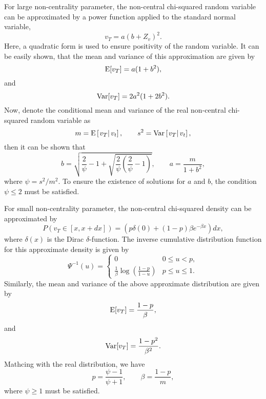 \documentclass[12pt]{article}
\begin{document}
    For large non-centrality parameter, the non-central chi-squared random variable can be approximated by a power function applied to the
    standard normal variable,
    \begin{equation}
      v_T=a\left(b+Z_v\right)^2.
      \label{Gaussian}
    \end{equation}
    Here, a quadratic form is used to ensure positivity of the random variable. It can be easily shown, that the mean and variance of this
    approximation are given by
    \begin{equation}
      {\rm E}[v_T]=a(1+b^2),
    \end{equation}
    and
    \begin{equation}
      {\rm Var}[v_T]=2a^2(1+2b^2).
    \end{equation}
    Now, denote the conditional mean and variance of the real non-central chi-squared random variable as
    \begin{equation}
      m={\rm E}\left[\left. v_T\right|v_t\right], \quad\quad s^2 = {\rm Var}\left[\left. v_T\right|v_t\right],
    \end{equation}
    then it can be shown that
    \begin{equation}
      b=\sqrt{\frac{2}{\psi}-1+\sqrt{\frac{2}{\psi}\left(\frac{2}{\psi}-1\right)}}, \quad\quad a = \frac{m}{1+b^2},
      \label{QE1}
    \end{equation}
    where $\psi=s^2/m^2$. To ensure the existence of solutions for $a$ and $b$, the condition $\psi\le 2$ must be satisfied.

    For small non-centrality parameter, the non-central chi-squared density can be approximated by
    \begin{equation}
      P\left(v_T\in[x,x+dx]\right)=\left(p\delta(0)+(1-p)\beta e^{-\beta x}\right)dx,
    \end{equation}
    where $\delta(x)$ is the Dirac $\delta$-function. The inverse cumulative distribution function for this approximate density
    is given by
    \begin{equation}
      \label{inverseCDF}
      \Psi^{-1}(u)=
      \begin{cases}
        0 & 0 \le u < p, \\
        \displaystyle \frac{1}{\beta}\log\left(\frac{1-p}{1-u}\right) & p\le u\le 1.
      \end{cases}
    \end{equation}
    Similarly, the mean and variance of the above approximate distribution are given by
    \begin{equation}
      {\rm E}[v_T]=\frac{1-p}{\beta},
    \end{equation}
    and
    \begin{equation}
      {\rm Var}[v_T]=\frac{1-p^2}{\beta^2}.
    \end{equation}
    Mathcing with the real distribution, we have
    \begin{equation}
      p=\frac{\psi-1}{\psi+1}, \quad\quad \beta=\frac{1-p}{m},
      \label{QE2}
    \end{equation}
    where $\psi\ge 1$ must be satisfied.
\end{document}
